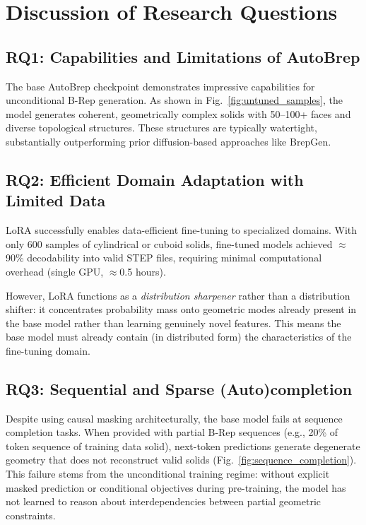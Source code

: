 \section{Discussion of Research Questions}
\label{chap:discussion}

\subsection{RQ1: Capabilities and Limitations of AutoBrep}

The base AutoBrep checkpoint demonstrates impressive capabilities for unconditional B-Rep generation. As shown in Fig.~\ref{fig:untuned_samples}, the model generates coherent, geometrically complex solids with 50--100+ faces and diverse topological structures. These structures are typically watertight, substantially outperforming prior diffusion-based approaches like BrepGen.


\subsection{RQ2: Efficient Domain Adaptation with Limited Data}

LoRA successfully enables data-efficient fine-tuning to specialized domains. With only 600 samples of cylindrical or cuboid solids, fine-tuned models achieved $\approx$90\% decodability into valid STEP files, requiring minimal computational overhead (single GPU, $\approx$0.5 hours). 

However, LoRA functions as a \emph{distribution sharpener} rather than a distribution shifter: it concentrates probability mass onto geometric modes already present in the base model rather than learning genuinely novel features. This means the base model must already contain (in distributed form) the characteristics of the fine-tuning domain. 

\subsection{RQ3: Sequential and Sparse (Auto)completion}

Despite using causal masking architecturally, the base model fails at sequence completion tasks. When provided with partial B-Rep sequences (e.g., 20\% of token sequence of training data solid), next-token predictions generate degenerate geometry that does not reconstruct valid solids (Fig.~\ref{fig:sequence_completion}). This failure stems from the unconditional training regime: without explicit masked prediction or conditional objectives during pre-training, the model has not learned to reason about interdependencies between partial geometric constraints.

